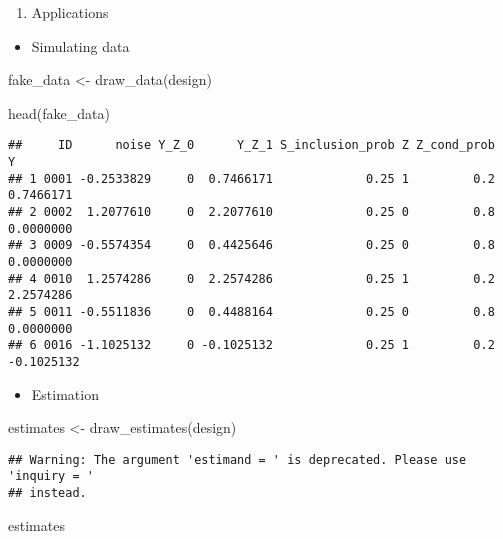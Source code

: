 \documentclass[
]{book}
\newenvironment{Shaded}{\begin{snugshade}}{\end{snugshade}}
\newcommand{\FunctionTok}[1]{\textcolor[rgb]{0.00,0.00,0.00}{#1}}
\newcommand{\NormalTok}[1]{#1}
\newcommand{\OtherTok}[1]{\textcolor[rgb]{0.56,0.35,0.01}{#1}}
\providecommand{\tightlist}{%
  \setlength{\itemsep}{0pt}\setlength{\parskip}{0pt}}
\begin{document}
\begin{enumerate}
\def\labelenumi{\arabic{enumi}.}
\setcounter{enumi}{1}
\tightlist
\item
  Applications
\end{enumerate}

\begin{itemize}
\tightlist
\item
  Simulating data
\end{itemize}

\begin{Shaded}
\begin{Highlighting}[]
\NormalTok{fake\_data }\OtherTok{\textless{}{-}} \FunctionTok{draw\_data}\NormalTok{(design)}

\FunctionTok{head}\NormalTok{(fake\_data)}
\end{Highlighting}
\end{Shaded}

\begin{verbatim}
##     ID      noise Y_Z_0      Y_Z_1 S_inclusion_prob Z Z_cond_prob          Y
## 1 0001 -0.2533829     0  0.7466171             0.25 1         0.2  0.7466171
## 2 0002  1.2077610     0  2.2077610             0.25 0         0.8  0.0000000
## 3 0009 -0.5574354     0  0.4425646             0.25 0         0.8  0.0000000
## 4 0010  1.2574286     0  2.2574286             0.25 1         0.2  2.2574286
## 5 0011 -0.5511836     0  0.4488164             0.25 0         0.8  0.0000000
## 6 0016 -1.1025132     0 -0.1025132             0.25 1         0.2 -0.1025132
\end{verbatim}

\begin{itemize}
\tightlist
\item
  Estimation
\end{itemize}

\begin{Shaded}
\begin{Highlighting}[]
\NormalTok{estimates }\OtherTok{\textless{}{-}} \FunctionTok{draw\_estimates}\NormalTok{(design)}
\end{Highlighting}
\end{Shaded}

\begin{verbatim}
## Warning: The argument 'estimand = ' is deprecated. Please use 'inquiry = '
## instead.
\end{verbatim}

\begin{Shaded}
\begin{Highlighting}[]
\NormalTok{estimates}
\end{Highlighting}
\end{Shaded}
\end{document}
